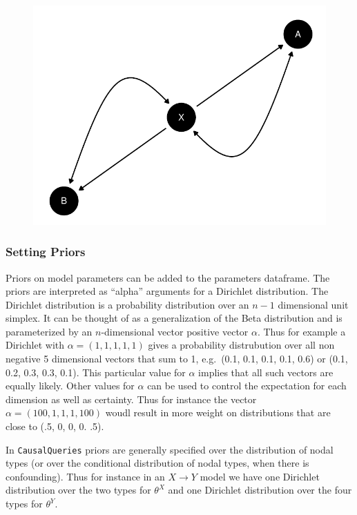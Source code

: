 \documentclass[
  article]{jss}
\begin{document}
\begin{figure}[H]

{\centering \includegraphics{paper_files/figure-pdf/unnamed-chunk-46-1.pdf}

}

\end{figure}

\hypertarget{priors}{%
\subsubsection{Setting Priors}\label{priors}}

Priors on model parameters can be added to the parameters dataframe. The
priors are interpreted as ``alpha'' arguments for a Dirichlet
distribution. The Dirichlet distribution is a probability distribution
over an \(n-1\) dimensional unit simplex. It can be thought of as a
generalization of the Beta distribution and is parameterized by an
\(n\)-dimensional vector positive vector \(\alpha\). Thus for example a
Dirichlet with \(\alpha = (1, 1, 1, 1, 1)\) gives a probability
distrubution over all non negative 5 dimensional vectors that sum to 1,
e.g.~(0.1, 0.1, 0.1, 0.1, 0.6) or (0.1, 0.2, 0.3, 0.3, 0.1). This
particular value for \(\alpha\) implies that all such vectors are
equally likely. Other values for \(\alpha\) can be used to control the
expectation for each dimension as well as certainty. Thus for instance
the vector \(\alpha = (100, 1, 1, 1, 100)\) woudl result in more weight
on distributions that are close to (.5, 0, 0, 0. .5).

In \texttt{CausalQueries} priors are generally specified over the
distribution of nodal types (or over the conditional distribution of
nodal types, when there is confounding). Thus for instance in an
\(X \rightarrow Y\) model we have one Dirichlet distribution over the
two types for \(\theta^X\) and one Dirichlet distribution over the four
types for \(\theta^Y\).
\end{document}
